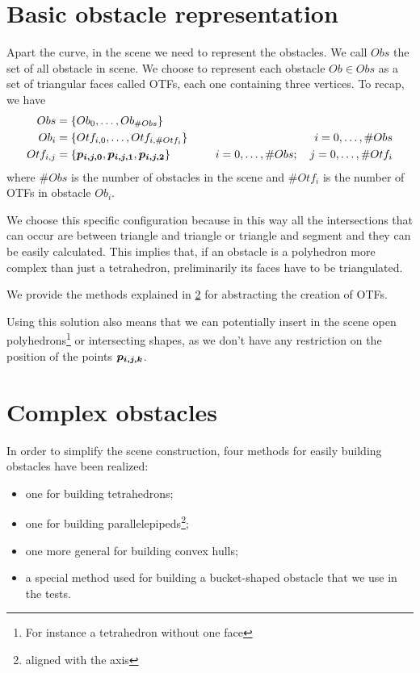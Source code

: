 \documentclass[dissertation.tex]{subfiles}
\begin{document}
\section{Basic obstacle representation}
Apart the curve, in the scene we need to represent the obstacles. We
call $Obs$ the set of all obstacle in scene. We choose to represent
each obstacle $Ob\in Obs$ as a set of triangular faces called
\acp{OTF}, each one containing three vertices. To recap, we have
\begin{equation*}
  \begin{split}
    Obs&=\{Ob_0,\dots,Ob_{\#Obs}\}\\
    Ob_i&=\{Otf_{i,0},\dots,Otf_{i,\#Otf_i}\}&i=0,\dots,\#Obs\\
    Otf_{i,j}&=\{\boldsymbol{p_{i,j,0}},\boldsymbol{p_{i,j,1}},\boldsymbol{p_{i,j,2}}\}\quad\qquad&
    i=0,\dots,\#Obs;\quad j=0,\dots,\#Otf_i
  \end{split}
\end{equation*}
where $\#Obs$ is the number of obstacles in the scene and $\#Otf_i$ is
the number of \acp{OTF} in obstacle $Ob_i$.

We choose this specific configuration because in this way all the
intersections that can occur are between triangle and triangle or
triangle and segment and they can be easily calculated. This implies
that, if an obstacle is a polyhedron more complex than just a
tetrahedron, preliminarily its faces have to be triangulated.

We provide the methods explained in \cref{sec:complexObs} for
abstracting the creation of \acp{OTF}.

Using this solution also means that we can potentially insert in the
scene open polyhedrons\footnote{For instance a tetrahedron without one
  face} or intersecting shapes, as we don't have
any restriction on the position of the points $\boldsymbol{p_{i,j,k}}$.

\section{Complex obstacles}\label{sec:complexObs}
In order to simplify the scene construction, four methods for easily
building obstacles have been realized: 
\begin{itemize}
\item one for building tetrahedrons;
\item one for building parallelepipeds\footnote{aligned with the axis};  
\item one more general for building convex hulls;
\item a special method used for building a bucket-shaped obstacle that
  we use in the tests.
\end{itemize}
\end{document}
